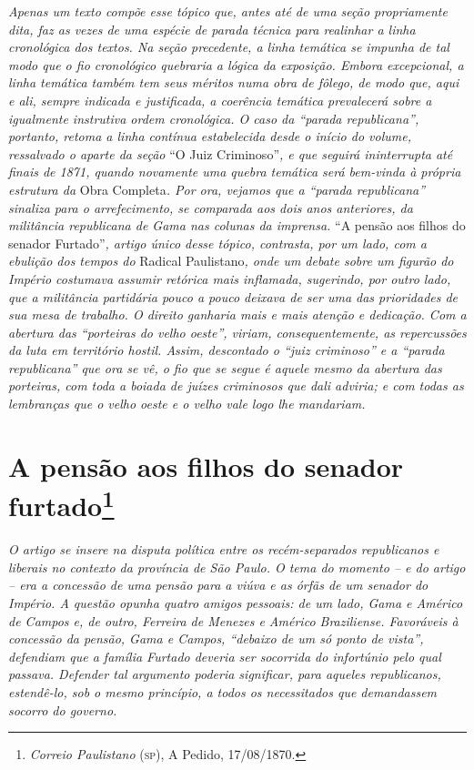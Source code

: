 {\begin{argumento}
\emph{Apenas um texto compõe esse tópico que, antes até de uma seção
propriamente dita, faz as vezes de uma espécie de parada técnica para
realinhar a linha cronológica dos textos. Na seção precedente, a linha
temática se impunha de tal modo que o fio cronológico quebraria a lógica
da exposição. Embora excepcional, a linha temática também tem seus
méritos numa obra de fôlego, de modo que, aqui e ali, sempre indicada e
justificada, a coerência temática prevalecerá sobre a igualmente
instrutiva ordem cronológica. O caso da ``parada republicana'', portanto,
retoma a linha contínua estabelecida desde o início do volume,
ressalvado o aparte da seção} ``O Juiz Criminoso''\emph{, e que seguirá
ininterrupta até finais de 1871, quando novamente uma quebra temática
será bem-vinda à própria estrutura da} Obra Completa\emph{. Por ora,
vejamos que a ``parada republicana'' sinaliza para o arrefecimento, se
comparada aos dois anos anteriores, da militância republicana de Gama
nas colunas da imprensa.} ``A pensão aos filhos do senador
Furtado''\emph{, artigo único desse tópico, contrasta, por um lado, com a
ebulição dos tempos do} Radical Paulistano\emph{, onde um debate sobre
um figurão do Império costumava assumir retórica mais inflamada,
sugerindo, por outro lado, que a militância partidária pouco a pouco
deixava de ser uma das prioridades de sua mesa de trabalho. O direito
ganharia mais e mais atenção e dedicação. Com a abertura das ``porteiras
do velho oeste'', viriam, consequentemente, as repercussões da luta em
território hostil. Assim, descontado o ``juiz criminoso'' e a ``parada
republicana'' que ora se vê, o fio que se segue é aquele mesmo da
abertura das porteiras, com toda a boiada de juízes criminosos que dali
adviria; e com todas as lembranças que o velho oeste e o velho vale logo
lhe mandariam.}
\end{argumento}

\chapter{A pensão aos filhos do senador furtado\footnote{\emph{Correio Paulistano} (\textsc{sp}), A Pedido, 17/08/1870.}}%

\begin{didascalia}
\emph{O artigo se insere na disputa política entre os recém-separados
republicanos e liberais no contexto da província de São Paulo. O tema do
momento -- e do artigo -- era a concessão de uma pensão para a viúva e
as órfãs de um senador do Império. A questão opunha quatro amigos
pessoais: de um lado, Gama e Américo de Campos e, de outro, Ferreira de
Menezes e Américo Braziliense. Favoráveis à concessão da pensão, Gama e
Campos, ``debaixo de um só ponto de vista'', defendiam que a família
Furtado deveria ser socorrida do infortúnio pelo qual passava. Defender
tal argumento poderia significar, para aqueles republicanos, estendê-lo,
sob o mesmo princípio, a todos os necessitados que demandassem socorro
do governo.}
\end{didascalia}


}

